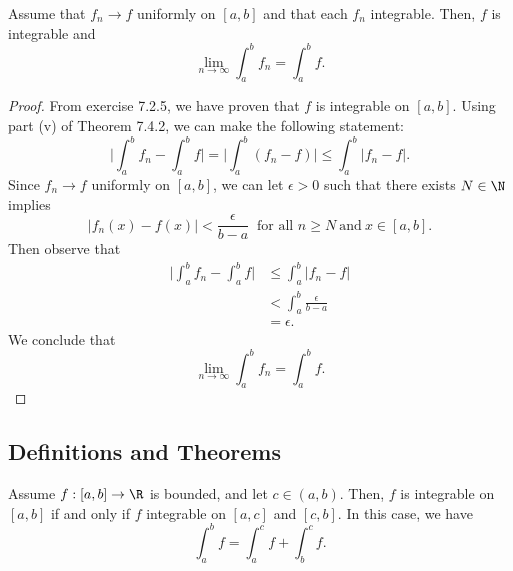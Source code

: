 \begin{tcolorbox}
	\begin{thm}
	Assume that \( f_{n} \to f  \) uniformly on \( [a,b]  \) and that each \( f_{n}  \) integrable. Then, \( f \) is integrable and 
	\[  \lim_{ n \to \infty  }  \int_{ a }^{ b } f_{n} = \int_{ a }^{ b } f. \]
	\end{thm}
\end{tcolorbox}
\begin{proof} From exercise 7.2.5, we have proven that \( f  \) is integrable on \( [a,b] \). 
	Using part (v) of Theorem 7.4.2, we can make the following statement:
	\[ \Big| \int_{ a }^{ b } f_{n} - \int_{ a }^{ b } f  \Big| = \Big| \int_{ a }^{ b }  (f_{n} - f )  \Big| \leq \int_{ a }^{ b }  | f_{n} -f  |.   \]
	Since \( f_{n} \to f  \) uniformly on \( [a,b] \), we can let \( \epsilon > 0  \) such that there exists \( N \in \N \) implies 
	\[  | f_{n}(x) - f(x)  | < \frac{ \epsilon  }{ b -a  }  \ \text{ for all } n \geq N \ \text{and} \ x \in [a,b].\] Then observe that 
	\begin{align*}
	    \Big| \int_{ a }^{ b } f_{n} - \int_{ a }^{ b } f  \Big| &\leq \int_{ a }^{ b } | f_{n} - f  |   \\
																 &< \int_{ a }^{ b }  \frac{ \epsilon  }{ b -a  } \\
																 &= \epsilon.
	\end{align*}
	We conclude that 
	\[  \lim_{ n \to \infty  }  \int_{ a }^{ b } f_{n} = \int_{ a }^{ b } f. \]
\end{proof}


\subsection{Definitions and Theorems}


\begin{tcolorbox}
\begin{thm}
	Assume \( f: [a,b] \to \R   \) is bounded, and let \( c \in (a,b)  \). Then, \( f  \) is integrable on \( [a,b]  \) if and only if \( f  \) integrable on \( [a,c]  \) and \( [c,b]  \). In this case, we have 
	\[  \int_{ a }^{ b } f = \int_{ a }^{ c }  f  + \int_{ b }^{ c }  f. \]
\end{thm}
\end{tcolorbox}


